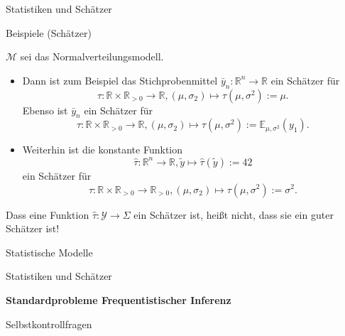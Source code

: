 \documentclass[
  8pt,
  ignorenonframetext,
]{beamer}
\providecommand{\tightlist}{%
  \setlength{\itemsep}{0pt}\setlength{\parskip}{0pt}}
\begin{document}
\begin{frame}{Statistiken und Schätzer}
\protect\hypertarget{statistiken-und-schuxe4tzer-3}{}
\small

Beispiele (Schätzer)

\(\mathcal{M}\) sei das Normalverteilungsmodell.

\begin{itemize}
\tightlist
\item
  Dann ist zum Beispiel das Stichprobenmittel
  \(\bar{y}_n : \mathbb{R}^n \to \mathbb{R}\) ein Schätzer für
  \begin{equation}
  \tau : \mathbb{R} \times \mathbb{R}_{>0} \to \mathbb{R},
  (\mu, \sigma_2) \mapsto \tau(\mu,\sigma^2) := \mu.
  \end{equation} Ebenso ist \(\bar{y}_n\) ein Schätzer für
  \begin{equation}
  \tau: \mathbb{R} \times \mathbb{R}_{>0} \to \mathbb{R},
  (\mu, \sigma_2) \mapsto \tau(\mu,\sigma^2) := \mathbb{E}_{\mu,\sigma^2}(y_1).
  \end{equation}
\item
  Weiterhin ist die konstante Funktion \begin{equation}
  \hat{\tau} : \mathbb{R}^n \to \mathbb{R}, \tilde{y} \mapsto \hat{\tau}(\tilde{y}) := 42
  \end{equation} ein Schätzer für \begin{equation}
  \tau : \mathbb{R} \times \mathbb{R}_{>0} \to \mathbb{R}_{>0},
  (\mu, \sigma_2) \mapsto \tau(\mu,\sigma^2) := \sigma^2.
  \end{equation}
\end{itemize}

Dass eine Funktion \(\hat{\tau} : \mathcal{Y} \to \Sigma\) ein Schätzer
ist, heißt nicht, dass sie ein guter Schätzer ist!
\end{frame}

\begin{frame}{}
\protect\hypertarget{section-7}{}
\large
{}
\vfill

Statistische Modelle

Statistiken und Schätzer

\textbf{Standardprobleme Frequentistischer Inferenz}

Selbstkontrollfragen \vfill
\end{frame}
\end{document}

